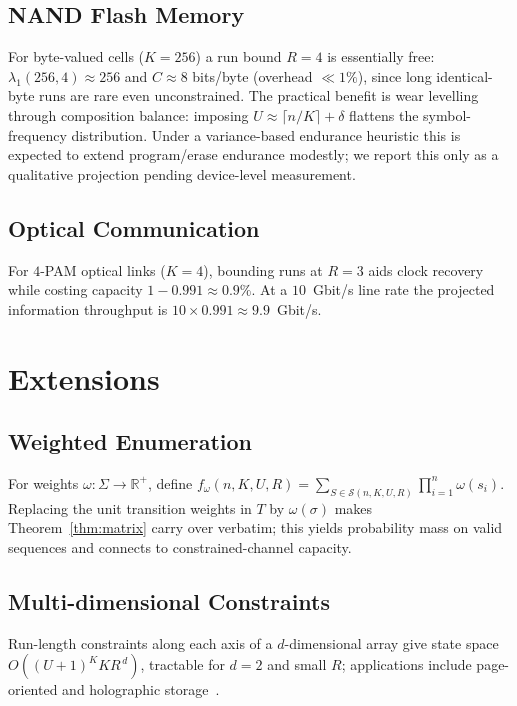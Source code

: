 \documentclass[a4paper,12pt]{article}
\begin{document}
\subsection{NAND Flash Memory}

For byte-valued cells ($K=256$) a run bound $R=4$ is essentially free:
$\lambda_1(256,4)\approx256$ and $C\approx8$ bits/byte (overhead
$\ll1\%$), since long identical-byte runs are rare even unconstrained.
The practical benefit is wear levelling through composition balance:
imposing $U\approx\lceil n/K\rceil+\delta$ flattens the symbol-frequency
distribution. Under a variance-based endurance heuristic this is
expected to extend program/erase endurance modestly; we report this
only as a qualitative projection pending device-level measurement.

\subsection{Optical Communication}

For $4$-PAM optical links ($K=4$), bounding runs at $R=3$ aids clock
recovery while costing capacity $1-0.991\approx0.9\%$. At a
$10$~Gbit/s line rate the projected information throughput is
$10\times0.991\approx9.9$~Gbit/s.

\section{Extensions}

\subsection{Weighted Enumeration}
For weights $\omega:\Sigma\to\mathbb{R}^+$, define
$f_\omega(n,K,U,R)=\sum_{S\in\mathcal{S}(n,K,U,R)}\prod_{i=1}^n
\omega(s_{i})$. Replacing the unit transition weights in $T$ by
$\omega(\sigma)$ makes Theorem~\ref{thm:matrix} carry over verbatim;
this yields probability mass on valid sequences and connects to
constrained-channel capacity.

\subsection{Multi-dimensional Constraints}
Run-length constraints along each axis of a $d$-dimensional array give
state space $O((U+1)^K K R^{\,d})$, tractable for $d=2$ and small $R$;
applications include page-oriented and holographic
storage~\cite{blaum1996}.
\end{document}
